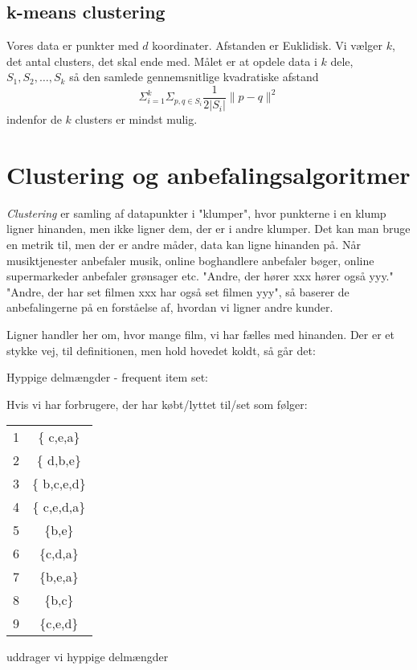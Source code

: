 \documentclass[a4paper, 12pt]{article}
\theoremstyle{remark}
\begin{document}
\subsection*{k-means clustering}
 Vores data er punkter med $d$ koordinater. Afstanden er Euklidisk. Vi vælger $k$, det antal clusters, det skal ende med. Målet er at opdele data i $k$ dele, $S_1, S_2,\ldots , S_k$ så den samlede gennemsnitlige kvadratiske afstand $$\Sigma_{i=1}^{k}\Sigma_{p,q\in S_i}\frac{1}{2|S_i|}\|p-q\|^2$$ indenfor de $k$ clusters er mindst mulig. 







\section*{Clustering og anbefalingsalgoritmer}

\emph{Clustering} er samling af datapunkter i "klumper", hvor punkterne i en klump ligner hinanden, men ikke ligner dem, der er i andre klumper. Det kan man bruge en metrik til, men der er andre måder, data kan ligne hinanden på. Når musiktjenester anbefaler musik, online boghandlere anbefaler bøger, online supermarkeder anbefaler grønsager etc. "Andre, der hører xxx hører også yyy." "Andre, der har set filmen xxx har også set filmen yyy", så baserer de anbefalingerne på en forståelse af, hvordan vi ligner andre kunder. 

Ligner handler her om, hvor mange film, vi har fælles med hinanden. Der er et stykke vej, til definitionen, men hold hovedet koldt, så går det:

Hyppige delmængder - frequent item set:

Hvis vi har forbrugere, der har købt/lyttet til/set som følger:
\begin{center}
\begin{tabular}{cc}
1 & \{ c,e,a\} \\
2 & \{ d,b,e\} \\
3 & \{ b,c,e,d\} \\
4& \{ c,e,d,a\} \\
5& \{b,e\} \\
6& \{c,d,a\} \\
7&\{b,e,a\} \\
8& \{b,c\} \\
9& \{c,e,d\} 

\end{tabular}
\end{center}
uddrager vi hyppige delmængder
\end{document}
